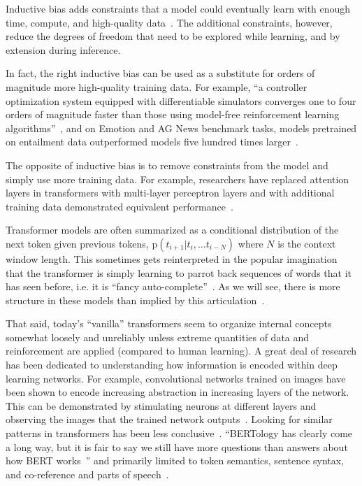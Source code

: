 \documentclass{article}
\begin{document}
Inductive bias adds constraints that a model could eventually learn with enough time, compute, and high-quality data~\citep{welling2019}. The additional constraints, however, reduce the degrees of freedom that need to be explored while learning, and by extension during inference.

In fact, the right inductive bias can be used as a substitute for orders of magnitude more high-quality training data.  For example, ``a controller optimization system equipped with differentiable simulators converges one to four orders of magnitude faster than those using model-free reinforcement learning algorithms''~\citep{10.5555/3327757.3327820},  and on Emotion and AG News benchmark tasks, models pretrained on entailment data outperformed models five hundred times larger~\citep{ge-etal-2023-entailment}.

The opposite of inductive bias is to remove constraints from the model and simply use more training data. For example, researchers have replaced attention layers in transformers with multi-layer perceptron layers and with additional training data demonstrated equivalent performance~\citep{liu2021pay}.

Transformer models are often summarized as a conditional distribution of the next token given previous tokens, p$(t_{i+1} | t_i, \ldots t_{i-N})$ where $N$ is the context window length. This sometimes gets reinterpreted in the popular imagination that the transformer is simply learning to parrot back sequences of words that it has seen before, i.e. it is ``fancy auto-complete''~\citep{marcus2023sentence}.  As we will see, there is more structure in these models than implied by this articulation~\citep{veres2022large}. %

That said, today's ``vanilla'' transformers seem to organize internal concepts somewhat loosely and unreliably unless extreme quantities of data and reinforcement are applied (compared to human learning). A great deal of research has been dedicated to understanding how information is encoded within deep learning networks. For example, convolutional networks trained on images have been shown to encode increasing abstraction in increasing layers of the network.  This can be demonstrated by stimulating neurons at different layers and observing the images that the trained network outputs~\citep{doi:10.1073/pnas.1907375117}.  Looking for similar patterns in transformers has been less conclusive~\citep{clark-etal-2019-bert}. ``BERTology has clearly come a long way, but it is fair to say we still have more questions than answers about how BERT works~\citep{rogers2020primer}'' and primarily limited to token semantics, sentence syntax, and co-reference and parts of speech~\cite{clark-etal-2019-bert}.
\end{document}
